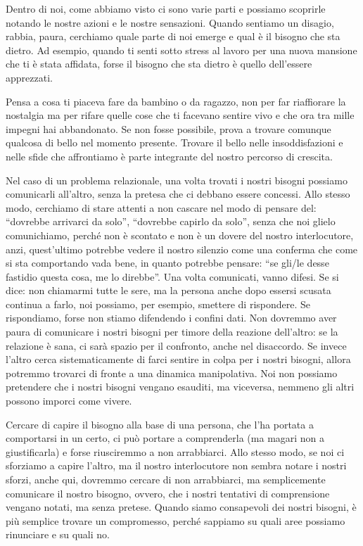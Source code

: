 \documentclass[12pt]{book} %
\begin{document}
Dentro di noi, come abbiamo visto ci sono varie parti e possiamo scoprirle notando le nostre azioni e le nostre
sensazioni. Quando sentiamo un disagio, rabbia, paura, cerchiamo quale parte di noi emerge e qual è il bisogno che sta
dietro. Ad esempio, quando ti senti sotto stress al lavoro per una nuova mansione che ti è stata affidata, forse il bisogno che sta dietro è quello dell'essere apprezzati.

Pensa a cosa ti piaceva fare da bambino o da ragazzo, non per far riaffiorare la nostalgia ma per rifare quelle cose che
ti facevano sentire vivo e che ora tra mille impegni hai abbandonato. Se non fosse possibile, prova a trovare comunque
qualcosa di bello nel momento presente. Trovare il bello nelle insoddisfazioni e nelle sfide che affrontiamo è parte
integrante del nostro percorso di crescita.

Nel caso di un problema relazionale, una volta trovati i nostri bisogni possiamo comunicarli all'altro, senza la pretesa che ci debbano essere concessi.
Allo stesso modo, cerchiamo di stare attenti a non cascare nel modo di pensare del: “dovrebbe arrivarci da solo”, “dovrebbe capirlo da solo”, senza che noi glielo comunichiamo, perché non è scontato e non è un dovere del nostro interlocutore, anzi, quest'ultimo potrebbe vedere il nostro silenzio come una
conferma che come si sta comportando vada bene, in quanto potrebbe pensare: “se gli/le desse fastidio questa cosa, me
lo direbbe”. Una volta comunicati, vanno difesi. Se si dice: non chiamarmi tutte le sere, ma la persona anche dopo
essersi scusata continua a farlo, noi possiamo, per esempio, smettere di rispondere. Se rispondiamo, forse non stiamo
difendendo i confini dati. Non dovremmo aver paura di comunicare i nostri bisogni per timore della reazione dell’altro: se la relazione è sana, ci sarà spazio per il confronto, anche nel disaccordo. Se invece l’altro cerca sistematicamente di farci sentire in colpa per i nostri bisogni, allora potremmo trovarci di fronte a una dinamica manipolativa. Noi non
possiamo pretendere che i nostri bisogni vengano esauditi, ma viceversa, nemmeno gli altri possono imporci come vivere. 

Cercare di capire il bisogno alla base di una persona, che l'ha portata a comportarsi in un certo,
ci può portare a comprenderla (ma magari non a giustificarla) e forse riusciremmo a non
arrabbiarci. Allo stesso modo, se noi ci sforziamo a capire l'altro, ma il nostro interlocutore non sembra notare i
nostri sforzi, anche qui, dovremmo cercare di non arrabbiarci, ma semplicemente comunicare il nostro bisogno, ovvero,
che i nostri tentativi di comprensione vengano notati, ma senza pretese. Quando siamo consapevoli dei nostri bisogni, è più semplice
trovare un compromesso, perché sappiamo su quali aree possiamo rinunciare e su quali no.
\end{document}
